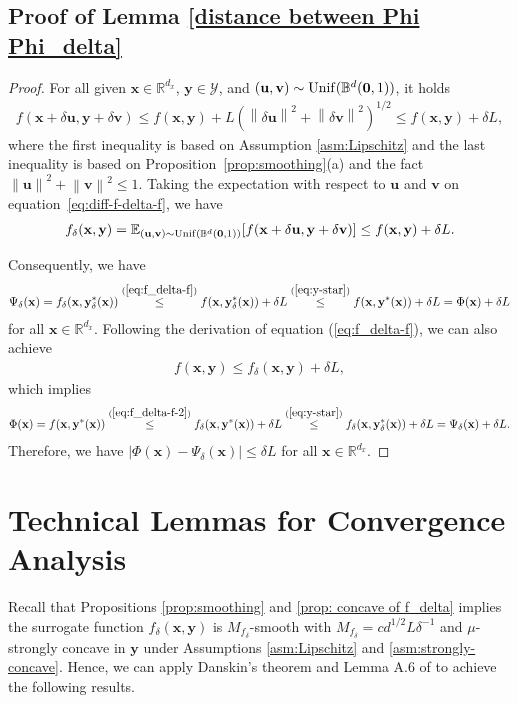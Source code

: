 \documentclass[11pt]{article}
\def\vzero{\mathbf{0}}
\def\vu{\mathbf{u}}
\def\vv{\mathbf{v}}
\def\vx{\mathbf{x}}
\def\vy{\mathbf{y}}
\def\fY{{\mathcal{Y}}}
\def\BE{{\mathbb{E}}}
\def\BB{{\mathbb{B}}}
\def\BR{{\mathbb{R}}}
\newcommand{\norm}[1]{\left\| #1 \right\|}
\begin{document}
\subsection{Proof of Lemma \ref{distance between Phi Phi_delta}}
\begin{proof}    
For all given $\vx\in\BR^{d_x}$, $\vy\in\fY$, and  $(\vu,\vv)\sim {\rm Unif}(\BB^d(\vzero,1))$,
it holds
\begin{align}\label{eq:diff-f-delta-f}
    f(\vx+\delta\vu,\vy+\delta\vv) 
    \leq f(\vx,\vy)  + L(\norm{\delta\vu}^2+\norm{\delta\vv}^2)^{1/2}
    \leq f(\vx,\vy) + \delta L,
\end{align}
where the first inequality is based on Assumption \ref{asm:Lipschitz} and the last inequality is based on 
Proposition~\ref{prop:smoothing}(a) and the fact $\norm{\vu}^2+\norm{\vv}^2\leq 1$.
Taking the expectation with respect to $\vu$ and $\vv$ on equation~\eqref{eq:diff-f-delta-f}, we have
\begin{align}\label{eq:f_delta-f}
    f_\delta(\vx,\vy) = \BE_{(\vu,\vv)\sim {\rm Unif}(\BB^d(\vzero,1))}[f(\vx+\delta\vu,\vy+\delta\vv)] 
    \leq f(\vx,\vy) + \delta L.
\end{align}

Consequently, we have
\begin{align*}
    \Psi_\delta(\vx) = f_\delta(\vx,\vy_\delta^*(\vx))
    \overset{(\ref{eq:f_delta-f})}{\leq}  f(\vx,\vy_\delta^*(\vx)) + \delta L
     \overset{(\ref{eq:y-star})}{\leq} f(\vx,\vy^*(\vx)) + \delta L
     = \Phi(\vx) + \delta L
\end{align*}
for all $\vx\in\BR^{d_x}$.
Following the derivation of equation (\ref{eq:f_delta-f}), we can also achieve
\begin{align}\label{eq:f_delta-f-2}
    f(\vx,\vy)  \leq f_\delta(\vx,\vy) + \delta L,
\end{align}
which implies
\begin{align*}
    \Phi(\vx) = f(\vx,\vy^*(\vx))
    \overset{(\ref{eq:f_delta-f-2})}{\leq}  f_\delta(\vx,\vy^*(\vx)) + \delta L
     \overset{(\ref{eq:y-star})}{\leq} f_\delta(\vx,\vy_\delta^*(\vx)) + \delta L
     = \Psi_\delta(\vx) + \delta L.
\end{align*}
Therefore, we have $|\Phi(\vx)-\Psi_\delta(\vx)|\leq \delta L$ for all $\vx\in\BR^{d_x}$.
\end{proof}



\section{Technical Lemmas for Convergence Analysis}\label{appendix:lemmas}
Recall that Propositions \ref{prop:smoothing} and \ref{prop: concave of f_delta} implies the surrogate function $f_\delta(\vx,\vy)$ is $M_{f_\delta}$-smooth with $M_{f_\delta}=cd^{1/2}L\delta^{-1}$ and $\mu$-strongly concave in $\vy$ under Assumptions \ref{asm:Lipschitz} and \ref{asm:strongly-concave}.
Hence, we can apply Danskin's theorem \citep{bertsekas1971control} and Lemma A.6 of \citet{chen2024efficient} to achieve the following results.
\end{document}
